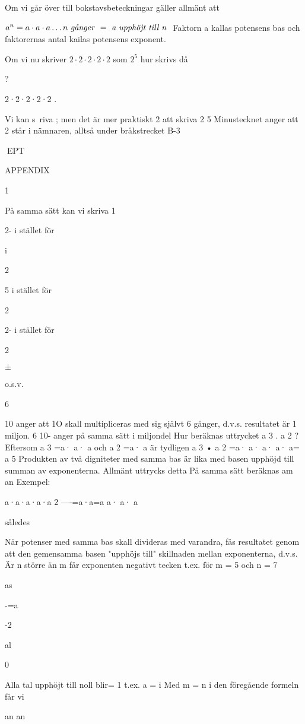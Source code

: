 Om vi går över till bokstavsbeteckningar gäller allmänt att

$a^n= a \cdot a \cdot a \ldots n \textrm{ \emph{g{\aa}nger} } = \textrm{ \emph{a
  upphöjt till n} }$ 
Faktorn a kallas potensens bas och faktorernas antal kailas potensens exponent.

Om vi nu skriver $2 \cdot 2 \cdot 2 \cdot 2 \cdot 2$ som $2^5$ hur skrivs då

?

2·2·2·2·2 .

Vi kan s~riva ; men det är mer praktiskt
2
att skriva 2
5
Minustecknet anger att 2 står i nämnaren, alltså under bråkstrecket
B-3

EPT

APPENDIX

1

På samma sätt kan vi skriva
1

2- i stället för

i

2

5 i stället för

2

2- i stället för

2~

$\pm$

o.s.v.

6

10 anger att 1O skall multipliceras med sig
självt 6 gånger, d.v.s. resultatet är 1 miljon.
6
10- anger på samma sätt i miljondel
Hur beräknas uttrycket a 3 . a 2 ?
Eftersom a 3 =a· a· a och a 2 =a· a
är tydligen a 3 • a 2 =a· a· a· a· a= a 5
Produkten av två digniteter med samma
bas är lika med basen upphöjd till summan av exponenterna.
Allmänt uttrycks detta
På samma sätt beräknas am
an
Exempel:

a·a·a·a·a
2
----=a·a=a
a· a· a

således

När potenser med samma bas skall divideras med varandra, fås resultatet genom att den gemensamma basen "upphöjs till" skillnaden mellan exponenterna,
d.v.s.
Är n större än m får exponenten negativt
tecken t.ex. för m = 5 och n = 7

as

-=a

-2

al

0

Alla tal upphöjt till noll blir= 1 t.ex. a = i
Med m = n i den föregående formeln får vi

an
an

